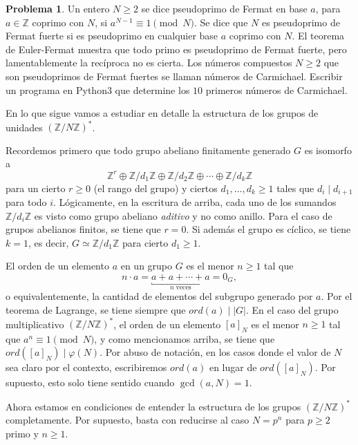 \documentclass[a4paper, 11pt]{article}
\newcommand{\ZZ}{\mathbb{Z}}
\newcounter{numerodetema}
\theoremstyle{plain}
\theoremstyle{definition}
\newtheorem{prob}{Problema}[numerodetema]
\begin{document}
\begin{prob}\label{prob:carmichael}
Un entero $N\geq 2$ se dice pseudoprimo de Fermat en base $a$, para $a\in\ZZ$
coprimo con $N$, si $a^{N-1}\equiv 1\pmod{N}$. Se dice que $N$ es pseudoprimo
de Fermat fuerte si es pseudoprimo en cualquier base $a$ coprimo con $N$.
El teorema de Euler-Fermat muestra que todo primo es pseudoprimo de Fermat
fuerte, pero lamentablemente la recíproca no es cierta. Los números compuestos
$N\geq 2$ que son pseudoprimos de Fermat fuertes se llaman números de Carmichael.
Escribir un programa en Python3 que determine los $10$ primeros números de
Carmichael.
\end{prob}

\bigskip

En lo que sigue vamos a estudiar en detalle la estructura de los grupos
de unidades $(\ZZ/N\ZZ)^*$.

\bigskip

Recordemos primero que todo grupo abeliano finitamente generado $G$ es
isomorfo a
\[
   \ZZ^r\oplus\ZZ/d_1\ZZ\oplus\ZZ/d_2\ZZ\oplus\cdots\oplus\ZZ/d_k\ZZ
\]
para un cierto $r\geq 0$ (el rango del grupo) y ciertos $d_1,\ldots,d_k\geq 1$
tales que $d_i\mid d_{i+1}$ para todo $i$. Lógicamente, en la escritura
de arriba, cada uno de los sumandos $\ZZ/d_i\ZZ$ es visto como grupo
abeliano \emph{aditivo} y no como anillo. Para el caso de grupos abelianos
finitos, se tiene que $r=0$. Si además el grupo es cíclico, se tiene $k=1$,
es decir, $G\simeq\ZZ/d_1\ZZ$ para cierto $d_1\geq 1$.

\bigskip

El orden de un elemento $a$ en un grupo $G$ es el menor $n\geq 1$ tal que
\[n\cdot a=\underbracket{a+a+\cdots+a}_{n\;\text{veces}}=0_G,\] o
equivalentemente, la cantidad de elementos del subgrupo generado por $a$.
Por el teorema de Lagrange, se tiene siempre que $ord(a)\mid|G|$. En el caso
del grupo multiplicativo $(\ZZ/N\ZZ)^*$, el orden de un elemento $[a]_N$ es el
menor $n\geq 1$ tal que $a^n\equiv1\pmod{N}$, y como mencionamos arriba, se
tiene que $ord([a]_N)\mid\varphi(N)$. Por abuso de notación, en los casos donde
el valor de $N$ sea claro por el contexto, escribiremos $ord(a)$ en lugar
de $ord([a]_N)$. Por supuesto, esto solo tiene sentido cuando $\gcd(a,N)=1$.

\bigskip

Ahora estamos en condiciones de entender la estructura de los grupos
$(\ZZ/N\ZZ)^*$ completamente. Por supuesto, basta con reducirse al
caso $N=p^n$ para $p\geq 2$ primo y $n\geq 1$.
\end{document}
